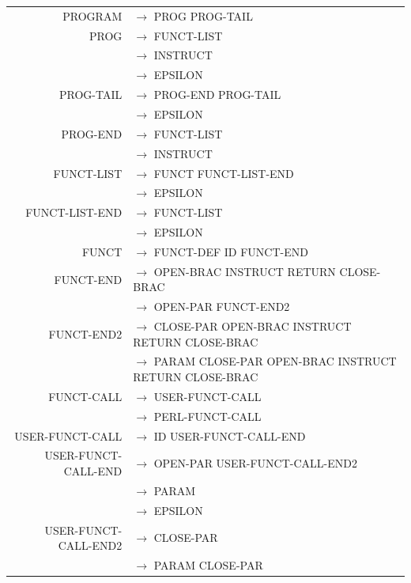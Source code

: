 \documentclass[a4paper,10pt]{article}
\begin{document}
\hspace{-3.5cm}\begin{tabular}{rl}
PROGRAM				& $\rightarrow$ PROG PROG-TAIL \\
PROG				& $\rightarrow$ FUNCT-LIST\\
					& $\rightarrow$ INSTRUCT\\
					& $\rightarrow$ EPSILON\\
PROG-TAIL			& $\rightarrow$ PROG-END PROG-TAIL\\
					& $\rightarrow$ EPSILON\\
					
PROG-END			& $\rightarrow$ FUNCT-LIST\\
					& $\rightarrow$ INSTRUCT\\
					
FUNCT-LIST			& $\rightarrow$ FUNCT FUNCT-LIST-END\\
					& $\rightarrow$ EPSILON\\
					
FUNCT-LIST-END		& $\rightarrow$ FUNCT-LIST\\
					& $\rightarrow$ EPSILON\\
					
FUNCT				& $\rightarrow$ FUNCT-DEF ID FUNCT-END \\

FUNCT-END			& $\rightarrow$ OPEN-BRAC INSTRUCT RETURN CLOSE-BRAC \\
					& $\rightarrow$ OPEN-PAR FUNCT-END2 \\

FUNCT-END2			& $\rightarrow$ CLOSE-PAR OPEN-BRAC INSTRUCT RETURN CLOSE-BRAC \\
					& $\rightarrow$ PARAM CLOSE-PAR OPEN-BRAC INSTRUCT RETURN CLOSE-BRAC \\

FUNCT-CALL			& $\rightarrow$ USER-FUNCT-CALL \\
					& $\rightarrow$ PERL-FUNCT-CALL \\

USER-FUNCT-CALL		& $\rightarrow$ ID USER-FUNCT-CALL-END\\ 

USER-FUNCT-CALL-END	& $\rightarrow$ OPEN-PAR USER-FUNCT-CALL-END2\\ 
					& $\rightarrow$ PARAM\\ 
					& $\rightarrow$ EPSILON\\
					
USER-FUNCT-CALL-END2& $\rightarrow$ CLOSE-PAR\\ 
					& $\rightarrow$ PARAM CLOSE-PAR\\ 


\end{tabular}
\end{document}
